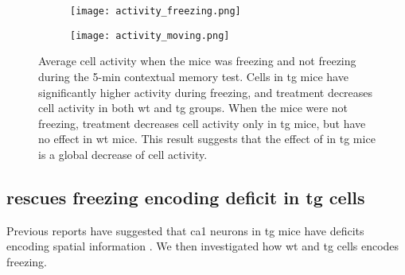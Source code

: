\begin{figure}[h]
    \begin{subfigure}[h]{\textwidth}
        \texttt{[image: activity\_freezing.png]}
        \caption{\label{f.ad.actf}}
    \end{subfigure}
    \begin{subfigure}[h]{\textwidth}
        \texttt{[image: activity\_moving.png]}
        \caption{\label{f.ad.actnf}}
    \end{subfigure}
    \caption{Average cell activity when the mice was  freezing and  not freezing during the 5-min contextual memory test. Cells in \gls{tg} mice have significantly higher activity during freezing, and \tglu treatment decreases cell activity in both \gls{wt} and \gls{tg} groups. When the mice were not freezing, \tglu treatment decreases cell activity only in \gls{tg} mice, but have no effect in \gls{wt} mice. This result suggests that the effect of \tglu in \gls{tg} mice is a global decrease of cell activity. \label{f.ad.activity_freezing}}
\end{figure}
\begin{comment}
\begin{figure}[h]
    \texttt{[image: sample\_trace.png]}
    \caption{Sample calcium transients from cells with highest freezing information in a mouse. It appears that cells encode freezing by decreasing their activity. \label{f.ad.sample_trace}}
\end{figure}
\begin{figure}[h]
    \texttt{[image: ch\_activity.png]}
    \caption{Distribution and mean of activity difference between not-freezing and freezing. This confirms the intuition from Figure~\ref{f.ad.sample_trace} that most of the cells decrease activity during freezing. \label{f.ad.ch_activity}}
\end{figure}
\end{comment}

\subsection{\tglu rescues freezing encoding deficit in \gls{tg} cells}

Previous reports have suggested that \gls{ca1} neurons in \gls{tg} mice have deficits encoding spatial information . We then investigated how \gls{wt} and \gls{tg} cells encodes freezing.  

